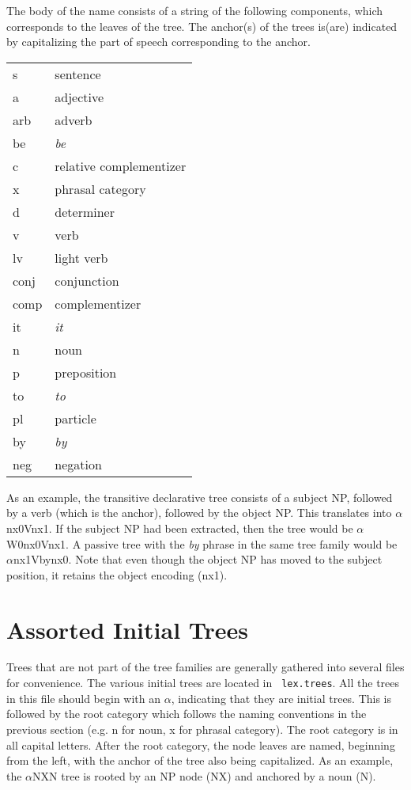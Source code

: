 \noindent The body of the name consists of a string of the following 
components, which corresponds to the leaves of the tree.  The anchor(s) of the
trees is(are) indicated by capitalizing the part of speech corresponding to the
anchor.

\begin{description}
\item\begin{tabular}{ll}
s&sentence\\
a&adjective\\
arb&adverb\\
be&{\it be}\\
c&relative complementizer\\
x&phrasal category\\
d&determiner\\
v&verb\\
lv&light verb\\
conj&conjunction\\
comp&complementizer\\
it&{\it it}\\
n&noun\\
p&preposition\\
to&{\it to}\\
pl&particle\\
by&{\it by}\\
neg&negation\\
\end{tabular}
\end{description}

\noindent As an example, the transitive declarative tree consists of a subject
NP, followed by a verb (which is the anchor), followed by the object NP.  This
translates into $\alpha$nx0Vnx1.  If the subject NP had been extracted, then
the tree would be $\alpha$W0nx0Vnx1.  A passive tree with the {\it by} phrase
in the same tree family would be $\alpha$nx1Vbynx0.  Note that even though the
object NP has moved to the subject position, it retains the object encoding
(nx1). 

\section{Assorted Initial Trees}

Trees that are not part of the tree families are generally gathered into
several files for convenience.  The various initial trees are located in {\tt
lex.trees}.  All the trees in this file should begin with an $\alpha$,
indicating that they are initial trees.  This is followed by the root category
which follows the naming conventions in the previous section (e.g. n for noun,
x for phrasal category).  The root category is in all capital letters.  After
the root category, the node leaves are named, beginning from the left, with the
anchor of the tree also being capitalized.  As an example, the $\alpha$NXN
tree is rooted by an NP node (NX) and anchored by a noun (N).

